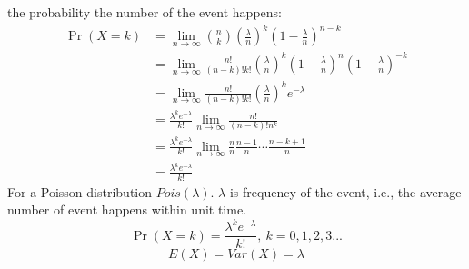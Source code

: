 \documentclass[11pt]{elegantbook}
\begin{document}
the probability the number of the event happens:
\begin{equation}
    \begin{aligned}
        \Pr(X=k)&=\lim_{n \rightarrow\infty} \binom{n}{k} (\frac{\lambda}{n})^k(1-\frac{\lambda}{n})^{n-k}\\
        &=\lim_{n \rightarrow\infty} \frac{n!}{(n-k)!k!} (\frac{\lambda}{n})^k(1-\frac{\lambda}{n})^{n}(1-\frac{\lambda}{n})^{-k}\\
        &=\lim_{n \rightarrow\infty}\frac{n!}{(n-k)!k!} (\frac{\lambda}{n})^k e^{-\lambda}\\
        &=\frac{\lambda^k e^{-\lambda}}{k!}\lim_{n \rightarrow\infty}\frac{n!}{(n-k)!n^k}\\
        &=\frac{\lambda^k e^{-\lambda}}{k!}\lim_{n \rightarrow\infty}
        \frac{n}{n}\frac{n-1}{n}\cdots \frac{n-k+1}{n}\\
        &=\frac{\lambda^k e^{-\lambda}}{k!}
    \end{aligned}
    \nonumber
\end{equation}
For a Poisson distribution $Pois(\lambda)$. $\lambda$ is frequency of the event, i.e., the average number of event happens within unit time.
$$\Pr(X{=}k)= \frac{\lambda^k e^{-\lambda}}{k!},\ k=0,1,2,3...$$
$$E(X)=Var(X)=\lambda$$
\end{document}
